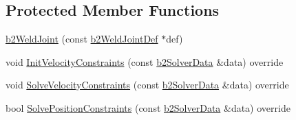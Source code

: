 \subsection*{Protected Member Functions}
\begin{DoxyCompactItemize}
\item 
\mbox{\hyperlink{classb2_weld_joint_a84dbb52e983d9039eab6ad64ae62d8eb}{b2\+Weld\+Joint}} (const \mbox{\hyperlink{structb2_weld_joint_def}{b2\+Weld\+Joint\+Def}} $\ast$def)
\item 
void \mbox{\hyperlink{classb2_weld_joint_afb54f848fe19f33555f01594e3e4f410}{Init\+Velocity\+Constraints}} (const \mbox{\hyperlink{structb2_solver_data}{b2\+Solver\+Data}} \&data) override
\item 
void \mbox{\hyperlink{classb2_weld_joint_a0367580735b117dcf9a4292df4daf883}{Solve\+Velocity\+Constraints}} (const \mbox{\hyperlink{structb2_solver_data}{b2\+Solver\+Data}} \&data) override
\item 
bool \mbox{\hyperlink{classb2_weld_joint_a068ae45ce6577e27669121032c277015}{Solve\+Position\+Constraints}} (const \mbox{\hyperlink{structb2_solver_data}{b2\+Solver\+Data}} \&data) override
\end{DoxyCompactItemize}
